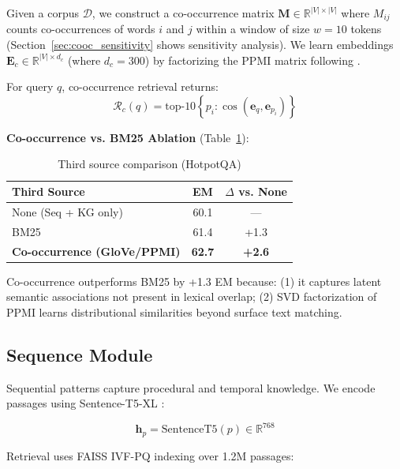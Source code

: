 \documentclass[10pt,twocolumn]{article}
\begin{document}
Given a corpus $\mathcal{D}$, we construct a co-occurrence matrix $\mathbf{M} \in \mathbb{R}^{|V| \times |V|}$ where $M_{ij}$ counts co-occurrences of words $i$ and $j$ within a window of size $w=10$ tokens (Section~\ref{sec:cooc_sensitivity} shows sensitivity analysis). We learn embeddings $\mathbf{E}_c \in \mathbb{R}^{|V| \times d_c}$ (where $d_c=300$) by factorizing the PPMI matrix following \cite{pennington2014glove}.

For query $q$, co-occurrence retrieval returns:
\begin{equation}
\mathcal{R}_c(q) = \text{top-}10 \left\{ p_i : \cos(\mathbf{e}_q, \mathbf{e}_{p_i}) \right\}
\end{equation}

\textbf{Co-occurrence vs. BM25 Ablation} (Table~\ref{tab:cooc_vs_bm25}):

\begin{table}[h]
\centering
\caption{Third source comparison (HotpotQA)}
\label{tab:cooc_vs_bm25}
\small
\begin{tabular}{@{}lcc@{}}
\toprule
\textbf{Third Source} & \textbf{EM} & \textbf{$\Delta$ vs. None} \\
\midrule
None (Seq + KG only) & 60.1 & --- \\
BM25 & 61.4 & +1.3 \\
\textbf{Co-occurrence (GloVe/PPMI)} & \textbf{62.7} & \textbf{+2.6} \\
\bottomrule
\end{tabular}
\end{table}

Co-occurrence outperforms BM25 by +1.3 EM because: (1) it captures latent semantic associations not present in lexical overlap; (2) SVD factorization of PPMI learns distributional similarities beyond surface text matching.


\subsection{Sequence Module}

Sequential patterns capture procedural and temporal knowledge. We encode passages using Sentence-T5-XL \cite{ni2022sentence_t5}:

\begin{equation}
\mathbf{h}_p = \text{SentenceT5}(p) \in \mathbb{R}^{768}
\end{equation}

Retrieval uses FAISS IVF-PQ indexing \cite{johnson2019faiss} over 1.2M passages:
\end{document}
